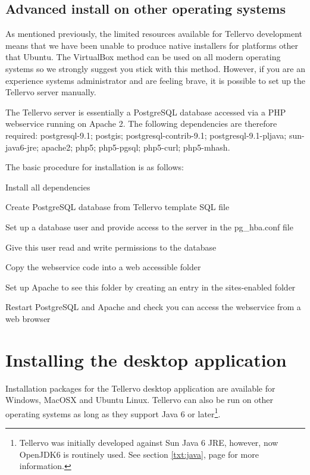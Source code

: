 \subsection{Advanced install on other operating systems}
\label{txt:installadvancedserver}
As mentioned previously, the limited resources available for Tellervo development means that we have been unable to produce native installers for platforms other that Ubuntu.  The VirtualBox method can be used on all modern operating systems so we strongly suggest you stick with this method.  However, if you are an experience systems administrator and are feeling brave, it is possible to set up the Tellervo server manually.  

The Tellervo server is essentially a PostgreSQL database accessed via a PHP webservice running on Apache 2.  The following dependencies are therefore required: postgresql-9.1; postgis; postgresql-contrib-9.1; postgresql-9.1-pljava; sun-java6-jre; apache2; php5; php5-pgsql; php5-curl; php5-mhash.

The basic procedure for installation is as follows:

\begin{itemize*}
 \item Install all dependencies
 \item Create PostgreSQL database from Tellervo template SQL file
 \item Set up a database user and provide access to the server in the pg\_hba.conf file
 \item Give this user read and write permissions to the database
 \item Copy the webservice code into a web accessible folder
 \item Set up Apache to see this folder by creating an entry in the sites-enabled folder
 \item Restart PostgreSQL and Apache and check you can access the webservice from a web browser
\end{itemize*}




\section{Installing the desktop application}
\label{txt:desktopinstall}
Installation packages for the Tellervo desktop application are available for Windows, MacOSX and Ubuntu Linux.  Tellervo can also be run on other operating systems as long as they support Java 6 or later\footnote{Tellervo was initially developed against Sun Java 6 JRE, however, now OpenJDK6 is routinely used.  See section \ref{txt:java}, page \pageref{txt:java} for more information.}.

